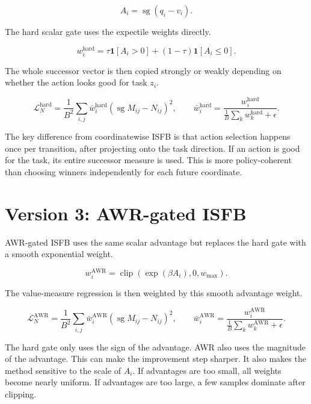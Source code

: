 \documentclass[11pt]{article}
\newcommand{\sg}{\operatorname{sg}}
\newcommand{\ind}{\mathbf{1}}
\newcommand{\clip}{\operatorname{clip}}
\begin{document}
\begin{equation}
A_i=\sg(q_i-v_i).
\end{equation}

The hard scalar gate uses the expectile weights directly.

\begin{equation}
w_i^{\mathrm{hard}}=\tau\ind[A_i>0]+(1-\tau)\ind[A_i\le 0].
\end{equation}

The whole successor vector is then copied strongly or weakly depending on whether the action looks good for task $z_i$.

\begin{equation}
\mathcal L_N^{\mathrm{hard}}=\frac{1}{B^2}\sum_{i,j}\bar w_i^{\mathrm{hard}}\left(\sg M_{ij}-N_{ij}\right)^2,\qquad \bar w_i^{\mathrm{hard}}=\frac{w_i^{\mathrm{hard}}}{\frac{1}{B}\sum_k w_k^{\mathrm{hard}}+\epsilon}.
\end{equation}

The key difference from coordinatewise ISFB is that action selection happens once per transition, after projecting onto the task direction.
If an action is good for the task, its entire successor measure is used.
This is more policy-coherent than choosing winners independently for each future coordinate.

\section{Version 3: AWR-gated ISFB}

AWR-gated ISFB uses the same scalar advantage but replaces the hard gate with a smooth exponential weight.

\begin{equation}
w_i^{\mathrm{AWR}}=\clip\!\left(\exp(\beta A_i),0,w_{\max}\right).
\end{equation}

The value-measure regression is then weighted by this smooth advantage weight.

\begin{equation}
\mathcal L_N^{\mathrm{AWR}}=\frac{1}{B^2}\sum_{i,j}\bar w_i^{\mathrm{AWR}}\left(\sg M_{ij}-N_{ij}\right)^2,\qquad \bar w_i^{\mathrm{AWR}}=\frac{w_i^{\mathrm{AWR}}}{\frac{1}{B}\sum_k w_k^{\mathrm{AWR}}+\epsilon}.
\end{equation}

The hard gate only uses the sign of the advantage.
AWR also uses the magnitude of the advantage.
This can make the improvement step sharper.
It also makes the method sensitive to the scale of $A_i$.
If advantages are too small, all weights become nearly uniform.
If advantages are too large, a few samples dominate after clipping.
\end{document}
